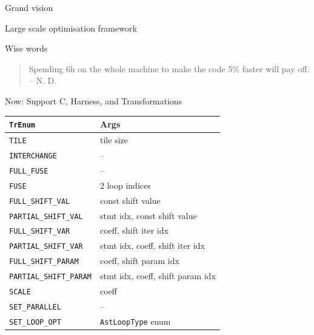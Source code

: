\documentclass[presentation, aspectratio=169]{beamer}
\begin{document}
\begin{frame}[label={sec:orgfeb3779}]{Grand vision}
\begin{block}{Large scale optimisation framework}
\begin{center}
\end{center}
\end{block}
\begin{block}{Wise words}
\begin{quote}
Spending 6h on the whole machine to make the code 5\% faster will pay off.  -- N. D.
\end{quote}
\end{block}
\end{frame}
\begin{frame}[label={sec:org0083ef8},fragile]{Now: Support C, Harness, and Transformations}
 \begin{center}
\begin{tabular}{ll}
\texttt{TrEnum} & Args\\
\hline
\texttt{TILE} & tile size\\
\texttt{INTERCHANGE} & --\\
\texttt{FULL\_FUSE} & --\\
\texttt{FUSE} & 2 loop indices\\
\texttt{FULL\_SHIFT\_VAL} & const shift value\\
\texttt{PARTIAL\_SHIFT\_VAL} & stmt idx, const shift value\\
\texttt{FULL\_SHIFT\_VAR} & coeff, shift iter idx\\
\texttt{PARTIAL\_SHIFT\_VAR} & stmt idx, coeff, shift iter idx\\
\texttt{FULL\_SHIFT\_PARAM} & coeff, shift param idx\\
\texttt{PARTIAL\_SHIFT\_PARAM} & stmt idx, coeff, shift param idx\\
\texttt{SCALE} & coeff\\
\texttt{SET\_PARALLEL} & --\\
\texttt{SET\_LOOP\_OPT} & \texttt{AstLoopType} enum\\
\end{tabular}
\end{center}
\end{frame}
\end{document}
